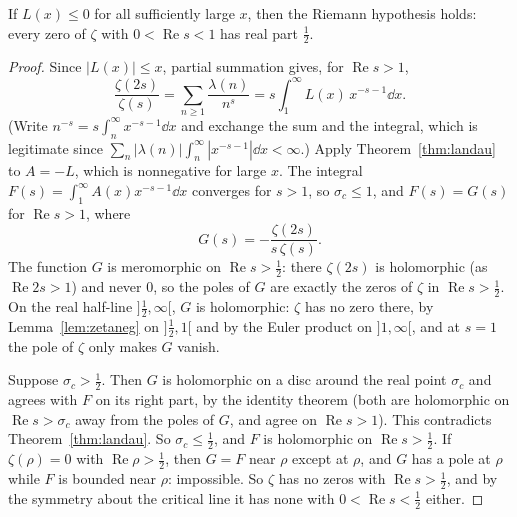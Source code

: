 \begin{theorem}[P\'olya, 1919]\label{thm:polyarh}
If $L(x)\le0$ for all sufficiently large $x$, then the Riemann hypothesis holds: every zero of $\zeta$ with $0<\operatorname{Re}s<1$ has real part $\frac12$.
\end{theorem}
\begin{proof}
Since $|L(x)|\le x$, partial summation gives, for $\operatorname{Re}s>1$,
\[
\frac{\zeta(2s)}{\zeta(s)}=\sum_{n\ge1}\frac{\lambda(n)}{n^s}=s\int_1^\infty L(x)\,x^{-s-1}\dd x.
\]
(Write $n^{-s}=s\int_n^\infty x^{-s-1}\dd x$ and exchange the sum and the integral, which is legitimate since $\sum_n|\lambda(n)|\int_n^\infty|x^{-s-1}|\dd x<\infty$.)
Apply Theorem~\ref{thm:landau} to $A=-L$, which is nonnegative for large $x$. The integral $F(s)=\int_1^\infty A(x)x^{-s-1}\dd x$ converges for $s>1$, so $\sigma_c\le1$,
and $F(s)=G(s)$ for $\operatorname{Re}s>1$, where
\[
G(s)=-\frac{\zeta(2s)}{s\,\zeta(s)}.
\]
The function $G$ is meromorphic on $\operatorname{Re}s>\frac12$: there $\zeta(2s)$ is holomorphic (as $\operatorname{Re}2s>1$) and never $0$, so the poles of $G$ are
exactly the zeros of $\zeta$ in $\operatorname{Re}s>\frac12$. On the real half-line $]\frac12,\infty[$, $G$ is holomorphic: $\zeta$ has no zero there, by
Lemma~\ref{lem:zetaneg} on $]\frac12,1[$ and by the Euler product on $]1,\infty[$, and at $s=1$ the pole of $\zeta$ only makes $G$ vanish.

Suppose $\sigma_c>\frac12$. Then $G$ is holomorphic on a disc around the real point $\sigma_c$ and agrees with $F$ on its right part, by the identity theorem (both
are holomorphic on $\operatorname{Re}s>\sigma_c$ away from the poles of $G$, and agree on $\operatorname{Re}s>1$). This contradicts Theorem~\ref{thm:landau}. So
$\sigma_c\le\frac12$, and $F$ is holomorphic on $\operatorname{Re}s>\frac12$. If $\zeta(\rho)=0$ with $\operatorname{Re}\rho>\frac12$, then $G=F$ near $\rho$ except
at $\rho$, and $G$ has a pole at $\rho$ while $F$ is bounded near $\rho$: impossible. So $\zeta$ has no zeros with $\operatorname{Re}s>\frac12$, and by the
symmetry about the critical line it has none with $0<\operatorname{Re}s<\frac12$ either.
\end{proof}

